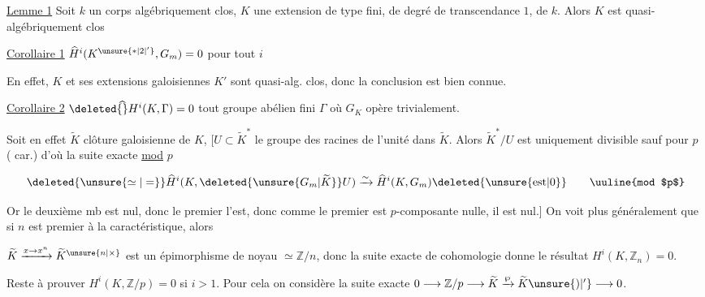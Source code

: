 
\uline{Lemme 1} Soit $k$ un corps algébriquement clos, $K$ une extension de type fini, de degré de transcendance $1$, de $k$. Alors $K$ est  quasi-algébriquement clos

\uline{Corollaire 1} $\widehat H^i(K^{\unsure{*|2|'}},G_m)=0$ pour tout $i$

En effet, $K$ et ses extensions galoisiennes $K'$ sont quasi-alg. clos, donc  la conclusion est bien connue.

\uline{Corollaire 2} $\deleted{\widehat{\vphantom H}}H^i(K,\Gamma)=0$    tout groupe abélien fini $\Gamma$ où $G_K$ opère trivialement.

Soit en effet $\widetilde K$   clôture galoisienne de $K$, [$U\subset\widetilde K^*$ le  groupe des racines de l'unité dans $\widetilde K$. Alors $\widetilde K^*/U$ est uniquement divisible sauf pour $p$ ( car.) d'où la suite exacte \uline{mod} $p$

\[\deleted{\unsure{\simeq|=}}\widehat H^i(K,\deleted{\unsure{G_m|\widetilde K}}U)\xrightarrow{\sim}\widehat H^i(K,G_m)\deleted{\unsure{\mathrm{est}|0}}\qquad\text{\uuline{mod $p$}}\]


Or le  deuxième mb est nul, donc le premier l'est, donc comme le premier  est $p$-composante nulle, il est nul.] On   voit plus généralement que si $n$ est premier à la caractéristique, alors

$\widetilde K\xrightarrow{x\to x^n}\widetilde K^{\unsure{n|\times}}$ est un épimorphisme de  noyau $\simeq\mathbb Z/n$, donc la suite exacte de cohomologie donne le résultat $H^i(K,\mathbb Z_n)=0$.

 Reste à prouver $H^i(K,\mathbb Z/p)=0$ si $i>1$. Pour cela on considère la suite exacte $0\longrightarrow\mathbb Z/p\longrightarrow\widetilde K\xrightarrow{\wp}\widetilde K\unsure{)|'}\longrightarrow0$.


